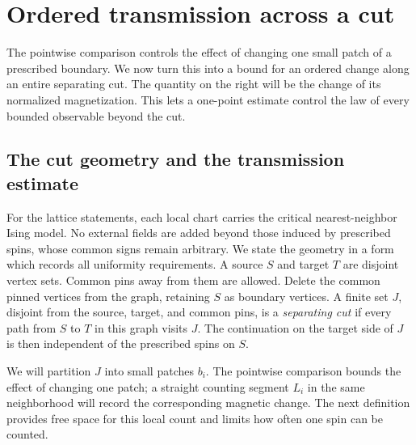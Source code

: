 \section{Ordered transmission across a cut}\label{tr:section}

The pointwise comparison controls the effect of changing one small patch
of a prescribed boundary. We now turn this into a bound for an ordered
change along an entire separating cut. The quantity on the right will be
the change of its normalized magnetization. This lets a one-point
estimate control the law of every bounded observable beyond the cut.

\subsection{The cut geometry and the transmission estimate}

For the lattice statements, each local chart carries the critical
nearest-neighbor Ising model. No external fields are added beyond those
induced by prescribed spins, whose common signs remain arbitrary. We state the geometry
in a form which records all uniformity requirements.
A source $S$ and target $T$ are disjoint vertex sets. Common pins away
from them are allowed. Delete the common pinned vertices from the graph,
retaining $S$ as boundary vertices. A finite set $J$, disjoint from the
source, target, and common pins, is a \emph{separating cut} if every path
from $S$ to $T$ in this graph visits $J$. The continuation on the target
side of $J$ is then independent of the prescribed spins on $S$.

We will partition $J$ into small patches $b_i$. The pointwise comparison
bounds the effect of changing one patch; a straight counting segment
$L_i$ in the same neighborhood will record the corresponding magnetic
change. The next definition provides free space for this local count
and limits how often one spin can be counted.

